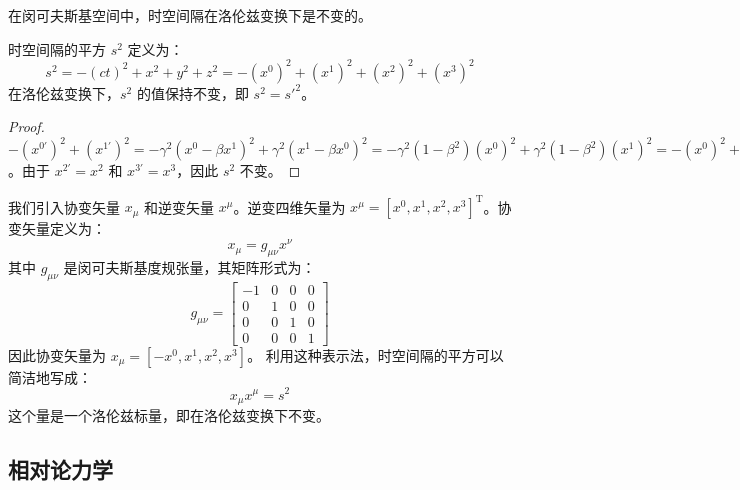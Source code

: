 \documentclass[fontset=none]{ctexart}
\begin{document}
在闵可夫斯基空间中，时空间隔在洛伦兹变换下是不变的。
\begin{proposition}[时空间隔不变性]
时空间隔的平方 $s^2$ 定义为：
\begin{equation}
s^2 = -(ct)^2 + x^2 + y^2 + z^2 = -(x^0)^2 + (x^1)^2 + (x^2)^2 + (x^3)^2
\end{equation}
在洛伦兹变换下，$s^2$ 的值保持不变，即 $s^2 = s'^{2}$。
\end{proposition}
\begin{proof}
$-(x^{0'})^2 + (x^{1'})^2 = -\gamma^2(x^0 - \beta x^1)^2 + \gamma^2(x^1 - \beta x^0)^2 = -\gamma^2(1-\beta^2)(x^0)^2 + \gamma^2(1-\beta^2)(x^1)^2 = -(x^0)^2 + (x^1)^2$。由于 $x^{2'}=x^2$ 和 $x^{3'}=x^3$，因此 $s^2$ 不变。
\end{proof}
我们引入协变矢量 $x_{\mu}$ 和逆变矢量 $x^{\mu}$。逆变四维矢量为 $x^{\mu} = [x^0, x^1, x^2, x^3]^{\mathrm{T}}$。协变矢量定义为：
\begin{equation}
x_{\mu} = g_{\mu\nu}x^{\nu}
\end{equation}
其中 $g_{\mu\nu}$ 是闵可夫斯基度规张量，其矩阵形式为：
\begin{equation}
g_{\mu\nu} = \begin{bmatrix} -1 & 0 & 0 & 0 \\ 0 & 1 & 0 & 0 \\ 0 & 0 & 1 & 0 \\ 0 & 0 & 0 & 1 \end{bmatrix}
\end{equation}
因此协变矢量为 $x_{\mu} = [-x^0, x^1, x^2, x^3]$。
利用这种表示法，时空间隔的平方可以简洁地写成：
\begin{equation}
x_{\mu}x^{\mu} = s^2
\end{equation}
这个量是一个洛伦兹标量，即在洛伦兹变换下不变。

\subsection{相对论力学}
\end{document}
